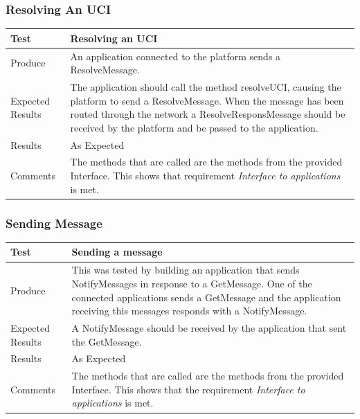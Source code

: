 \subsubsection{Resolving An UCI}
\begin{center}
    \begin{tabular}{ | l | p{12cm} |}
    \hline
    Test 	 				& 		 Resolving an UCI\\ \hline
	Produce  				& 		 An application connected to the platform sends a ResolveMessage.\\ \hline
	Expected Results  		& 		 The application should call the method resolveUCI, causing the platform to send a ResolveMessage. When the message has been routed through the network a ResolveResponsMessage should be received by the platform and be passed to the application. \\ \hline
	Results 				& 		 As Expected\\ \hline
	Comments				& 		 The methods that are called are the methods from the provided Interface. This shows that requirement \emph{Interface to applications} is met.\\ \hline
    \end{tabular}
\end{center}

\subsubsection{Sending Message}
\begin{center}
    \begin{tabular}{ | l | p{12cm} |}
    \hline
    Test 	 				& 		 Sending a message\\ \hline
	Produce  				& 		 This was tested by building an application that sends NotifyMessages in response to a GetMessage. One of the connected applications sends a GetMessage and the application receiving this messages responds with a NotifyMessage.\\ \hline
	Expected Results  		& 		 A NotifyMessage should be received by the application that sent the GetMessage.\\ \hline
	Results 				& 		 As Expected\\ \hline
	Comments				& 		 The methods that are called are the methods from the provided Interface. This shows that the requirement \emph{Interface to applications} is met. \\ \hline
    \end{tabular}
\end{center}

